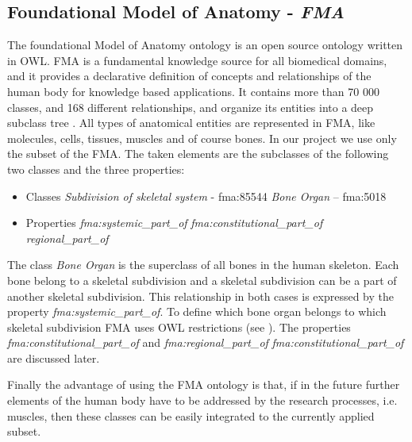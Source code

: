 \subsection{Foundational Model of Anatomy - \textit{FMA}} 

The foundational Model of Anatomy ontology is an open source ontology written in OWL. FMA is a fundamental knowledge source for all biomedical domains, and it provides a declarative definition of concepts and relationships of the human body for knowledge based applications. It contains more than 70 000 classes, and 168 different relationships, and organize its entities into a deep subclass tree \cite{Rosse2003478}. All types of anatomical entities are represented in FMA, like molecules, cells, tissues, muscles and of course bones. In our project we use only the subset of the FMA. The taken elements are the subclasses of the following two classes and the three properties: 

\begin{itemize}
	\item{Classes}
		\subitem \textit{Subdivision of skeletal system} - fma:85544 
		\subitem \textit{Bone Organ} – fma:5018
\end{itemize}

\begin{itemize}
	\item{Properties}
		\subitem \textit{fma:systemic\_part\_of}
		\subitem \textit{fma:constitutional\_part\_of}
		\subitem \textit{regional\_part\_of}
\end{itemize}

The class \textit{Bone Organ} is the superclass of all bones in the human skeleton. Each bone belong to a skeletal subdivision and a skeletal subdivision can be a part of another skeletal subdivision. This relationship in both cases is expressed by the property \textit{fma:systemic\_part\_of}. To define which bone organ belongs to which skeletal subdivision FMA uses OWL restrictions (see ). The properties \textit{fma:constitutional\_part\_of} and \textit{fma:regional\_part\_of} \textit{fma:constitutional\_part\_of} are discussed later.


Finally the advantage of using the FMA ontology is that, if in the future further elements of the human body have to be addressed by the research processes, i.e. muscles, then these classes can be easily integrated to the currently applied subset.

